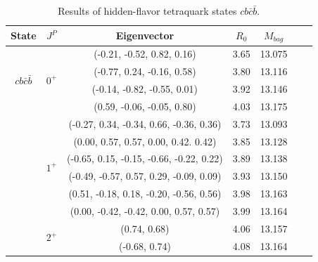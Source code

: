 \documentclass[prd,twocolumn,floatfix,nofootinbib]{revtex4}
\begin{document}
\renewcommand{\tabcolsep}{0.84cm}
\renewcommand{\arraystretch}{1.2}
\begin{table}[!htbp]
    \caption{Results of hidden-flavor tetraquark states $cb\bar{c}\bar{b}$.}
    \label{tab:hiddenflavor-cbcb}
    \begin{tabular}{ccccccc}
        \hline\hline
        {\rm State}     &$J^{P}$    &{\rm Eigenvector}                          &$R_{0}$    &$M_{bag}$ \\ \hline
        \multirow{4}{*}{$cb\bar{c}\bar{b}$}
                        &\multirow{4}{*}{$0^{+}$}
                                    &(-0.21, -0.52, 0.82, 0.16)                 &3.65	    &13.075 \\ 
                        &           &(-0.77, 0.24, -0.16, 0.58)                 &3.80	    &13.116 \\ 
                        &           &(-0.14, -0.82, -0.55, 0.01)                &3.92	    &13.146 \\ 
                        &           &(0.59, -0.06, -0.05, 0.80)                 &4.03	    &13.175 \\ 
                        &\multirow{6}{*}{$1^{+}$}
                                    &(-0.27, 0.34, -0.34, 0.66, -0.36, 0.36)    &3.73	    &13.093 \\ 
                        &           &(0.00, 0.57, 0.57, 0.00, 0.42. 0.42)       &3.85	    &13.128 \\ 
                        &           &(-0.65, 0.15, -0.15, -0.66, -0.22, 0.22)   &3.89	    &13.138 \\ 
                        &           &(-0.49, -0.57, 0.57, 0.29, -0.09, 0.09)    &3.93	    &13.150 \\ 
                        &           &(0.51, -0.18, 0.18, -0.20, -0.56, 0.56)    &3.98	    &13.163 \\ 
                        &           &(0.00, -0.42, -0.42, 0.00, 0.57, 0.57)     &3.99	    &13.164 \\ 
                        &\multirow{2}{*}{$2^{+}$}
                                    &(0.74, 0.68)                               &4.06	    &13.157 \\ 
                        &           &(-0.68, 0.74)                              &4.08	    &13.164 \\ 
        \hline\hline
    \end{tabular}
\end{table}
\end{document}
